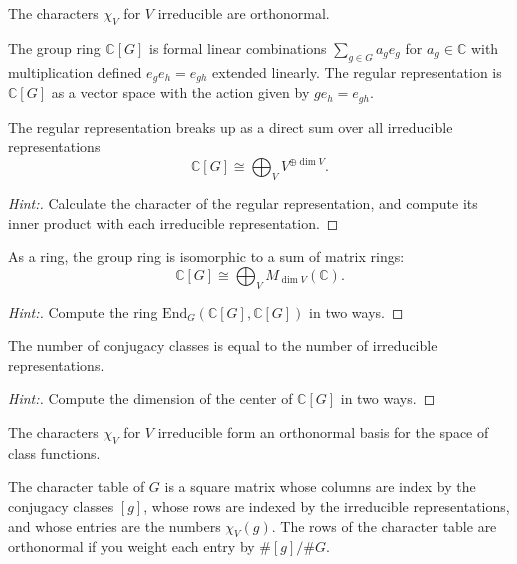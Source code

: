 \documentclass[11pt]{article}
\begin{document}
\begin{exercise}
The characters $\chi_V$ for $V$ irreducible are orthonormal.
\end{exercise}

\begin{definition}
The group ring $\mathbb{C}[G]$ is formal linear combinations $\sum_{g \in G} a_g e_g$ for $a_g \in \mathbb{C}$ with multiplication defined $e_g e_h = e_{gh}$ extended linearly.  The regular representation is $\mathbb{C}[G]$ as a vector space with the action given by $g e_h = e_{gh}$.
\end{definition}

\begin{exercise}
The regular representation breaks up as a direct sum over all irreducible representations
$$\mathbb{C}[G] \cong \bigoplus_V V^{\oplus \dim V}.$$
\end{exercise}
\begin{proof}[Hint:]
Calculate the character of the regular representation, and compute its inner product with each irreducible representation.
\end{proof}

\begin{exercise}
As a ring, the group ring is isomorphic to a sum of matrix rings:
$$\mathbb{C}[G] \cong \bigoplus_V M_{\dim V}(\mathbb{C}).$$
\end{exercise}
\begin{proof}[Hint:]
Compute the ring $\mathrm{End}_G(\mathbb{C}[G], \mathbb{C}[G])$ in two ways.
\end{proof}

\begin{exercise}
The number of conjugacy classes is equal to the number of irreducible representations.
\end{exercise}
\begin{proof}[Hint:]
Compute the dimension of the center of $\mathbb{C}[G]$ in two ways.
\end{proof}

\begin{exercise}
The characters $\chi_V$ for $V$ irreducible form an orthonormal basis for the space of class functions.
\end{exercise}

\begin{definition}
The character table of $G$ is a square matrix whose columns are index by the conjugacy classes $[g]$, whose rows are indexed by the irreducible representations, and whose entries are the numbers $\chi_V(g)$.  The rows of the character table are orthonormal if you weight each entry by $\#[g]/\#G$.
\end{definition}
\end{document}
